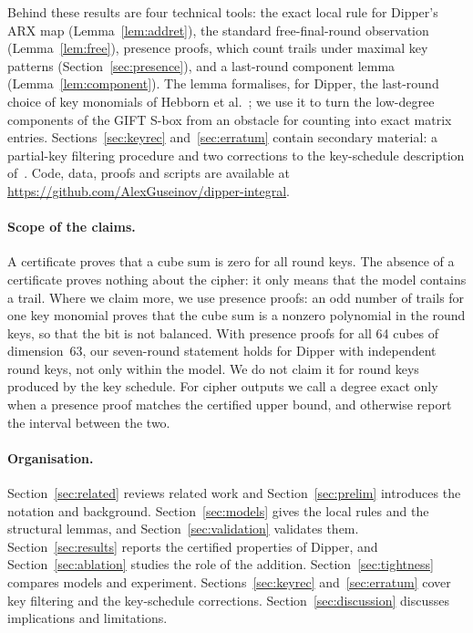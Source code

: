 \documentclass[11pt,a4paper]{article}
\theoremstyle{definition}
\theoremstyle{remark}
\newcommand{\repo}{\url{https://github.com/AlexGuseinov/dipper-integral}}
\begin{document}
Behind these results are four technical tools: the exact local rule for Dipper's ARX map (Lemma~\ref{lem:addret}), the standard free-final-round observation (Lemma~\ref{lem:free}), presence proofs, which count trails under maximal key patterns (Section~\ref{sec:presence}), and a last-round component lemma (Lemma~\ref{lem:component}). The lemma formalises, for Dipper, the last-round choice of key monomials of Hebborn et al.~\cite{hebborn2021}; we use it to turn the low-degree components of the GIFT S-box from an obstacle for counting into exact matrix entries. Sections~\ref{sec:keyrec} and~\ref{sec:erratum} contain secondary material: a partial-key filtering procedure and two corrections to the key-schedule description of~\cite{dipper2026}. Code, data, proofs and scripts are available at \repo{}.

\paragraph{Scope of the claims.} A certificate proves that a cube sum is zero for all round keys. The absence of a certificate proves nothing about the cipher: it only means that the model contains a trail. Where we claim more, we use presence proofs: an odd number of trails for one key monomial proves that the cube sum is a nonzero polynomial in the round keys, so that the bit is not balanced. With presence proofs for all 64 cubes of dimension~63, our seven-round statement holds for Dipper with independent round keys, not only within the model. We do not claim it for round keys produced by the key schedule. For cipher outputs we call a degree exact only when a presence proof matches the certified upper bound, and otherwise report the interval between the two.

\paragraph{Organisation.} Section~\ref{sec:related} reviews related work and Section~\ref{sec:prelim} introduces the notation and background. Section~\ref{sec:models} gives the local rules and the structural lemmas, and Section~\ref{sec:validation} validates them. Section~\ref{sec:results} reports the certified properties of Dipper, and Section~\ref{sec:ablation} studies the role of the addition. Section~\ref{sec:tightness} compares models and experiment. Sections~\ref{sec:keyrec} and~\ref{sec:erratum} cover key filtering and the key-schedule corrections. Section~\ref{sec:discussion} discusses implications and limitations.
\end{document}
